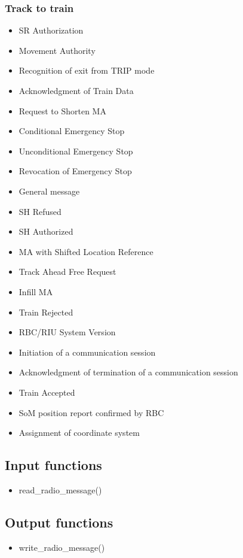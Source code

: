 \documentclass{template/openetcs_article}
\begin{document}
		\subsubsection{Track to train}
			\begin{itemize}
				\item SR Authorization
				\item Movement Authority
				\item Recognition of exit from TRIP mode
				\item Acknowledgment of Train Data
				\item Request to Shorten MA
				\item Conditional Emergency Stop
				\item Unconditional Emergency Stop
				\item Revocation of Emergency Stop
				\item General message
				\item SH Refused
				\item SH Authorized
				\item MA with Shifted Location Reference
				\item Track Ahead Free Request
				\item Infill MA
				\item Train Rejected
				\item RBC/RIU System Version
				\item Initiation of a communication session
				\item Acknowledgment of termination of a communication session
				\item Train Accepted
				\item SoM position report confirmed by RBC
				\item Assignment of coordinate system				
			\end{itemize}
	
	\subsection{Input functions}
		\begin{itemize}
			\item read\_radio\_message()
		\end{itemize}
	\subsection{Output functions}
		\begin{itemize}
			\item write\_radio\_message()
		\end{itemize}
		
\end{document}
